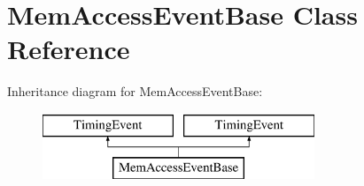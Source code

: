 \hypertarget{classMemAccessEventBase}{\section{Mem\-Access\-Event\-Base Class Reference}
\label{classMemAccessEventBase}
}
Inheritance diagram for Mem\-Access\-Event\-Base\-:\begin{figure}[H]
\begin{center}
\leavevmode
\includegraphics[height=2.000000cm]{classMemAccessEventBase}
\end{center}
\end{figure}
